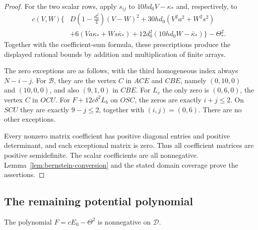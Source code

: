 \begin{proof}
For the two scalar rows, apply $s_{ij}$ to
$10h d_0V-\kappa_*$ and, respectively, to
\[
\begin{aligned}
 c(V,W)\bigg\{&D\left(1-\frac{d_0^2}{4}\right)(V-W)^2
       +30h d_0(V^2a^2+W^2s^2)\\
 &+6(Va\kappa_*+Ws\bar\kappa_*)
       +12d_0^2(10h d_0W-\bar\kappa_*)\bigg\}-\Theta_*^2.
\end{aligned}
\]
Together with the coefficient-sum formula, these prescriptions produce
the displayed rational bounds by addition and multiplication of finite
arrays.

The zero exceptions are as follows, with the third homogeneous index
always $N-i-j$. For $\mathcal B$, they are the vertex $C$ in $ACE$
and $CBE$, namely $(0,10,0)$ and $(10,0,0)$, and also $(9,1,0)$ in
$CBE$. For $L_v$ the only zero is $(0,6,0)$, the vertex $C$ in $OCU$.
For $F+12c\delta^2L_b$ on $OSC$, the zeros are exactly $i+j\le2$.
On $SCU$ they are exactly $9-j\le2$, together with $(i,j)=(0,6)$.
There are no other exceptions.

Every nonzero matrix coefficient has positive diagonal entries and
positive determinant, and each exceptional matrix is zero. Thus all
coefficient matrices are positive semidefinite. The scalar coefficients
are all nonnegative. Lemma~\ref{lem:bernstein-conversion} and the stated
domain coverage prove the assertions.
\end{proof}

\subsection{The remaining potential polynomial}

\begin{lemma}\label{lem:potential-certificate}
The polynomial $F=cE_0-\Theta^2$ is nonnegative on $\mathcal D$.
\end{lemma}

